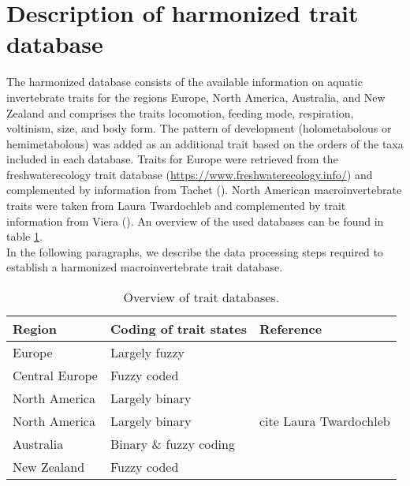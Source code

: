 \documentclass{article}
\begin{document}
\section{Description of harmonized trait database} %

The harmonized database consists of the available information on aquatic invertebrate traits for the regions 
Europe, North America, Australia, and New Zealand and comprises the traits locomotion, feeding mode, respiration, voltinism, 
size, and body form. The pattern of development (holometabolous or hemimetabolous) was added as an additional trait 
based on the orders of the taxa included in each database. 
Traits for Europe were retrieved from the freshwaterecology trait database (\url{https://www.freshwaterecology.info/}) 
and complemented by information from Tachet (\cite{usseglio-polatera_biomonitoring_2000}). 
North American macroinvertebrate traits were taken from Laura Twardochleb and complemented by trait information from Viera (\cite{vieira_database_nodate}). 
An overview of the used databases can be found in table \ref{tab:trait_databases}. \\ 
In the following paragraphs, we describe the data processing steps required to establish a harmonized 
macroinvertebrate trait database. 

\begin{table}[H]
    \centering
    \caption{Overview of trait databases.}
    \label{tab:trait_databases}
    \begin{tabular}{lll}
    \toprule
   Region & Coding of trait states & Reference \\ 
    \hline
   Europe & Largely fuzzy & \cite{schmidt-kloiber_www.freshwaterecology.info_2015}\\ 
   Central Europe & Fuzzy coded & \cite{usseglio-polatera_biomonitoring_2000} \\ 
   North America & Largely binary & \cite{vieira_database_nodate}\\
   North America & Largely binary & cite Laura Twardochleb \\
   Australia & Binary \& fuzzy coding  & \cite{kefford_ben_AST_DB_2019}\\ 
   New Zealand & Fuzzy coded & \\ %
    \bottomrule
    \end{tabular}
\end{table}
\end{document}

